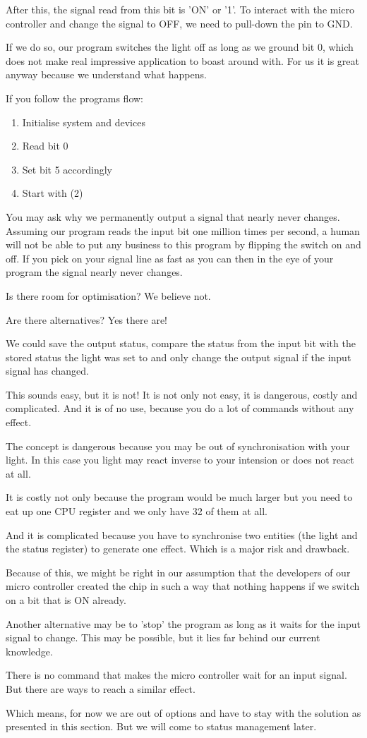 After this, the signal read from this bit is 'ON' or '1'. To interact with the micro controller and change the signal to OFF, we need to pull-down the pin to GND.

If we do so, our program switches the light off as long as we ground bit 0, which does not make real impressive application to boast around with. For us it is great anyway because we understand what happens.

If you follow the programs flow:

\begin{enumerate}
  \item Initialise system and devices
  \item Read bit 0
  \item Set bit 5 accordingly
  \item Start with (2)
\end{enumerate}

You may ask why we permanently output a signal that nearly never changes. Assuming our program reads the input bit one million times per second, a human will not be able to put any business to this program by flipping the switch on and off. If you pick on your signal line as fast as you can then in the eye of your program the signal nearly never changes.

Is there room for optimisation? We believe not.

Are there alternatives? Yes there are!

We could save the output status, compare the status from the input bit with the stored status the light was set to and only change the output signal if the input signal has changed.

This sounds easy, but it is not! It is not only not easy, it is dangerous, costly and complicated. And it is of no use, because you do a lot of commands without any effect.

The concept is dangerous because you may be out of synchronisation with your light. In this case you light may react inverse to your intension or does not react at all.

It is costly not only because the program would be much larger but you need to eat up one CPU register and we only have 32 of them at all.

And it is complicated because you have to synchronise two entities (the light and the status register) to generate one effect. Which is a major risk and drawback.

Because of this, we might be right in our assumption that the developers of our \at micro controller created the chip in such a way that nothing happens if we switch on a bit that is ON already.

Another alternative may be to 'stop' the program as long as it waits for the input signal to change. This may be possible, but it lies far behind our current knowledge.

There is no command that makes the micro controller wait for an input signal. But there are ways to reach a similar effect.

Which means, for now we are out of options and have to stay with the solution as presented in this section. But we will come to status management later.